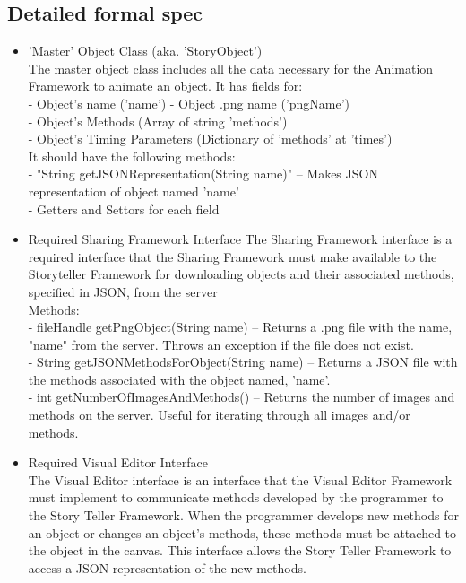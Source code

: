 \documentclass[12pt]{article}
\begin{document}
\subsection{Detailed formal spec}
\begin{itemize}
	\item 'Master' Object Class (aka. 'StoryObject') \\
	The master object class includes all the data necessary for the Animation Framework to
	animate an object. It has fields for: \\

	\indent - Object's name ('name')
	\indent - Object .png name ('pngName') \\
	\indent - Object's Methods (Array of string 'methods') \\
	\indent - Object's Timing Parameters (Dictionary of 'methods' at 'times') \\
	
	It should have the following methods: \\
	\indent - "String getJSONRepresentation(String name)" -- Makes JSON representation of object named 'name' \\
	\indent - Getters and Settors for each field \\
	
	\item Required Sharing Framework Interface
	The Sharing Framework interface is a required interface that the Sharing Framework must make available to the Storyteller Framework for downloading objects and their associated methods, specified in JSON, from the server \\
	
	Methods: \\
	\indent - fileHandle getPngObject(String name) -- Returns a .png file with the name, "name" from the server. Throws an exception if the file does not exist. \\
	\indent - String getJSONMethodsForObject(String name) -- Returns a JSON file with the methods associated with the object named, 'name'. \\
	\indent - int getNumberOfImagesAndMethods() -- Returns the number of images and methods on the server. Useful for iterating through all images and/or methods. \\
	
	\item Required Visual Editor Interface \\
	The Visual Editor interface is an interface that the Visual Editor Framework must implement to communicate methods developed by the programmer to the Story Teller Framework. When the programmer develops new methods for an object or changes an object's methods, these methods must be attached to the object in the canvas. This interface allows the Story Teller Framework to access a JSON representation of the new methods. \\
	

\end{itemize}
\end{document}
